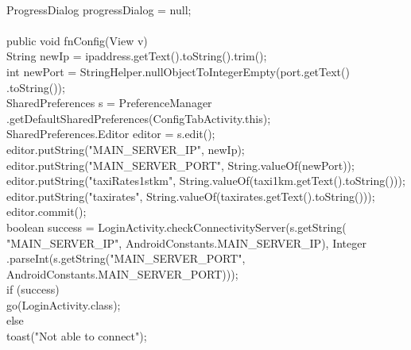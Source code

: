 \documentclass[12pt,a4paper]{article}
\begin{document}
\\
	ProgressDialog progressDialog = null;\\
\\
	public void fnConfig(View v) {\\

		String newIp = ipaddress.getText().toString().trim();\\
		int newPort = StringHelper.nullObjectToIntegerEmpty(port.getText()
				.toString());\\
		SharedPreferences s = PreferenceManager
				.getDefaultSharedPreferences(ConfigTabActivity.this);\\
		SharedPreferences.Editor editor = s.edit();\\
		editor.putString("MAIN_SERVER_IP", newIp);\\
		editor.putString("MAIN_SERVER_PORT", String.valueOf(newPort));\\
		editor.putString("taxiRates1stkm",
				String.valueOf(taxi1km.getText().toString()));\\
		editor.putString("taxirates",
				String.valueOf(taxirates.getText().toString()));\\
		editor.commit();\\

		boolean success = LoginActivity.checkConnectivityServer(s.getString(
				"MAIN_SERVER_IP", AndroidConstants.MAIN_SERVER_IP), Integer
				.parseInt(s.getString("MAIN_SERVER_PORT",
						AndroidConstants.MAIN_SERVER_PORT)));\\
		if (success) {\\
			go(LoginActivity.class);\\

		} else {\\
			toast("Not able to connect");\\
		}\\

	}\\
\\

\newpage
\\
\end{document}

